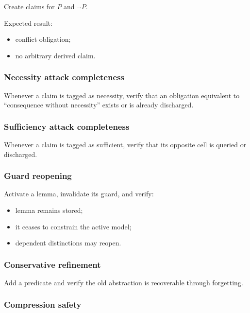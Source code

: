 \documentclass[
]{article}
\providecommand{\tightlist}{%
  \setlength{\itemsep}{0pt}\setlength{\parskip}{0pt}}
\begin{document}
Create claims for \(P\) and \(\neg P\).

Expected result:

\begin{itemize}
\tightlist
\item
  conflict obligation;
\item
  no arbitrary derived claim.
\end{itemize}

\subsubsection{Necessity attack
completeness}\label{necessity-attack-completeness}

Whenever a claim is tagged as necessity, verify that an obligation
equivalent to ``consequence without necessity'' exists or is already
discharged.

\subsubsection{Sufficiency attack
completeness}\label{sufficiency-attack-completeness}

Whenever a claim is tagged as sufficient, verify that its opposite cell
is queried or discharged.

\subsubsection{Guard reopening}\label{guard-reopening}

Activate a lemma, invalidate its guard, and verify:

\begin{itemize}
\tightlist
\item
  lemma remains stored;
\item
  it ceases to constrain the active model;
\item
  dependent distinctions may reopen.
\end{itemize}

\subsubsection{Conservative refinement}\label{conservative-refinement}

Add a predicate and verify the old abstraction is recoverable through
forgetting.

\subsubsection{Compression safety}\label{compression-safety}
\end{document}
